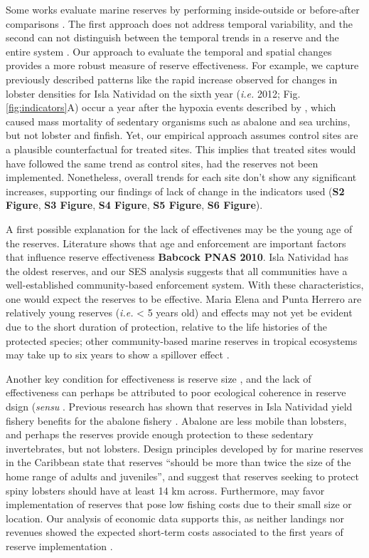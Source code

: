 \documentclass{frontiersSCNS}
\theoremstyle{definition}
\theoremstyle{definition}
\theoremstyle{definition}
\theoremstyle{remark}
\begin{document}
Some works evaluate marine reserves by performing inside-outside
\citep{guidetti_2014-8Z,friedlander_2017-oI,rodriguez_2017-PD} or
before-after comparisons \citep{betti_2017-lq}. The first approach does
not address temporal variability, and the second can not distinguish
between the temporal trends in a reserve and the entire system
\citep{depalma_2018}. Our approach to evaluate the temporal and spatial
changes provides a more robust measure of reserve effectiveness. For
example, we capture previously described patterns like the rapid
increase observed for changes in lobster densities for Isla Natividad on
the sixth year (\emph{i.e.} 2012; Fig. \ref{fig:indicators}A) occur a
year after the hypoxia events described by \citet{micheli_2012-EU},
which caused mass mortality of sedentary organisms such as abalone and
sea urchins, but not lobster and finfish. Yet, our empirical approach
assumes control sites are a plausible counterfactual for treated sites.
This implies that treated sites would have followed the same trend as
control sites, had the reserves not been implemented. Nonetheless,
overall trends for each site don't show any significant increases,
supporting our findings of lack of change in the indicators used
(\textbf{S2 Figure}, \textbf{S3 Figure}, \textbf{S4 Figure}, \textbf{S5
Figure}, \textbf{S6 Figure}).

A first possible explanation for the lack of effectivenes may be the
young age of the reserves. Literature shows that age and enforcement are
important factors that influence reserve effectiveness
\citep{edgar_2014-UO} \textbf{Babcock PNAS 2010}. Isla Natividad has the
oldest reserves, and our SES analysis suggests that all communities have
a well-established community-based enforcement system. With these
characteristics, one would expect the reserves to be effective. Maria
Elena and Punta Herrero are relatively young reserves (\emph{i.e.}
\textless{} 5 years old) and effects may not yet be evident due to the
short duration of protection, relative to the life histories of the
protected species; other community-based marine reserves in tropical
ecosystems may take up to six years to show a spillover effect
\citep{dasilva_2015-zX}.

Another key condition for effectiveness is reserve size
\citep{edgar_2014-UO}, and the lack of effectiveness can perhaps be
attributed to poor ecological coherence in reserve dsign (\emph{sensu}
\citet{rees_2018}. Previous research has shown that reserves in Isla
Natividad yield fishery benefits for the abalone fishery
\citep{rossetto_2015-V0}. Abalone are less mobile than lobsters, and
perhaps the reserves provide enough protection to these sedentary
invertebrates, but not lobsters. Design principles developed by
\citet{green_2017} for marine reserves in the Caribbean state that
reserves ``should be more than twice the size of the home range of
adults and juveniles'', and suggest that reserves seeking to protect
spiny lobsters should have at least 14 km across. Furthermore, may favor
implementation of reserves that pose low fishing costs due to their
small size or location. Our analysis of economic data supports this, as
neither landings nor revenues showed the expected short-term costs
associated to the first years of reserve implementation
\citep{ovando_2016-Wg}.
\end{document}
